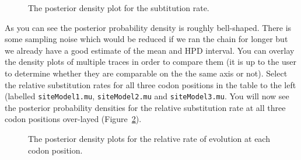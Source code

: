 \documentclass[cup7b, english]{cupbook}
\begin{document}
\begin{figure}[htbp]
\begin{center}
\leavevmode
{}
\end{center}
\caption{The posterior density plot for the subtitution rate.}
\label{fig:figure8}
\end{figure}

As you can see the posterior probability density is roughly bell-shaped.
There is some sampling noise which would be reduced if we ran the chain for longer but
we already have a good estimate of the mean and HPD interval. You can overlay
the density plots of multiple traces in order to compare them (it is up to the user to determine
whether they are comparable on the the same axis or not). Select the relative substitution rates for all three
codon positions in the table to the left (labelled \texttt{siteModel1.mu}, \texttt{siteModel2.mu} and \texttt{siteModel3.mu}. You will now see
the posterior probability densities for the relative substitution rate at all three codon positions
over-layed (Figure~\ref{fig:figure9}).

\begin{figure}[htbp]
\begin{center}
\leavevmode
{}
\end{center}
\caption{The posterior density plots for the relative rate of evolution at each
codon position.}
\label{fig:figure9}
\end{figure}
\end{document}
